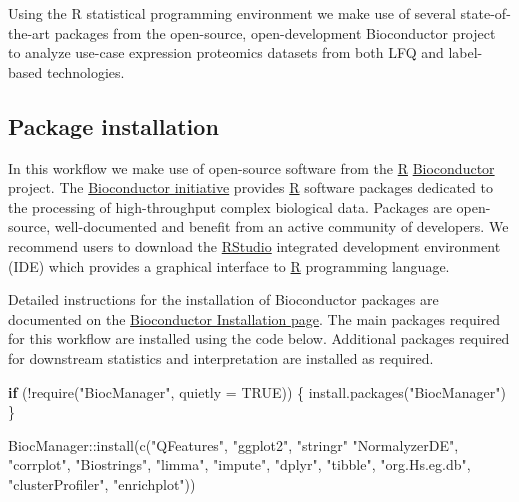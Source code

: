 \documentclass[9pt,a4paper,]{extarticle}
\newenvironment{Shaded}{\begin{snugshade}}{\end{snugshade}}
\newcommand{\AttributeTok}[1]{\textcolor[rgb]{0.77,0.63,0.00}{#1}}
\newcommand{\ConstantTok}[1]{\textcolor[rgb]{0.00,0.00,0.00}{#1}}
\newcommand{\ControlFlowTok}[1]{\textcolor[rgb]{0.13,0.29,0.53}{\textbf{#1}}}
\newcommand{\FunctionTok}[1]{\textcolor[rgb]{0.00,0.00,0.00}{#1}}
\newcommand{\NormalTok}[1]{#1}
\newcommand{\SpecialCharTok}[1]{\textcolor[rgb]{0.00,0.00,0.00}{#1}}
\newcommand{\StringTok}[1]{\textcolor[rgb]{0.31,0.60,0.02}{#1}}
\begin{document}
Using the R statistical programming environment \citep{Rstat} we make use of several
state-of-the-art packages from the open-source, open-development Bioconductor
project \citep{Huber2015} to analyze use-case expression proteomics datasets
\citep{HutchingsData} from both LFQ and label-based technologies.

\hypertarget{package-installation}{%
\subsection{Package installation}\label{package-installation}}

In this workflow we make use of open-source software from the
\href{https://www.r-project.org}{R} \href{https://bioconductor.org}{Bioconductor}
\citep{Huber2015} project. The \href{https://bioconductor.org}{Bioconductor initiative}
provides \href{https://www.r-project.org}{R} software packages dedicated
to the processing of high-throughput complex biological data. Packages are
open-source, well-documented and benefit from an active community of developers.
We recommend users to download the
\href{https://posit.co/download/rstudio-desktop/}{RStudio} integrated development
environment (IDE) which provides a graphical interface to
\href{https://www.r-project.org}{R} programming language.

Detailed instructions for the installation of Bioconductor packages are
documented on the \href{http://bioconductor.org/install/}{Bioconductor Installation page}.
The main packages required for this workflow are installed using the code below.
Additional packages required for downstream statistics and interpretation are
installed as required.

\begin{Shaded}
\begin{Highlighting}[]
\ControlFlowTok{if}\NormalTok{ (}\SpecialCharTok{!}\FunctionTok{require}\NormalTok{(}\StringTok{"BiocManager"}\NormalTok{, }\AttributeTok{quietly =} \ConstantTok{TRUE}\NormalTok{)) \{}
  \FunctionTok{install.packages}\NormalTok{(}\StringTok{"BiocManager"}\NormalTok{)}
\NormalTok{\}}

\NormalTok{BiocManager}\SpecialCharTok{::}\FunctionTok{install}\NormalTok{(}\FunctionTok{c}\NormalTok{(}\StringTok{"QFeatures"}\NormalTok{,}
                       \StringTok{"ggplot2"}\NormalTok{,}
                       \StringTok{"stringr"}
                       \StringTok{"NormalyzerDE"}\NormalTok{,}
                       \StringTok{"corrplot"}\NormalTok{,}
                       \StringTok{"Biostrings"}\NormalTok{,}
                       \StringTok{"limma"}\NormalTok{,}
                       \StringTok{"impute"}\NormalTok{,}
                       \StringTok{"dplyr"}\NormalTok{,}
                       \StringTok{"tibble"}\NormalTok{,}
                       \StringTok{"org.Hs.eg.db"}\NormalTok{,}
                       \StringTok{"clusterProfiler"}\NormalTok{,}
                       \StringTok{"enrichplot"}\NormalTok{))}
\end{Highlighting}
\end{Shaded}
\end{document}
